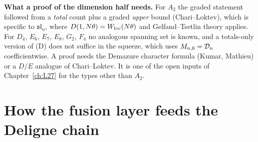 \begin{warning}
\textbf{What a proof of the dimension half needs.} For $A_2$ the graded statement followed from a \emph{total} count plus a graded
\emph{upper} bound (Chari--Loktev), which is specific to $\mathfrak{sl}_n$, where $D(1,N\theta)=W_{\mathrm{loc}}(N\theta)$ and
Gelfand--Tsetlin theory applies. For $D_4$, $E_6$, $E_7$, $E_8$, $G_2$, $F_4$ no analogous spanning set is known, and a totals-only
version of (D) does not suffice in the squeeze, which uses $M_{n,0}=\mathcal D_n$ coefficientwise. A proof needs the Demazure character
formula (Kumar, Mathieu) or a $D/E$ analogue of Chari--Loktev. It is one of the open inputs of Chapter~\ref{ch:L27} for the types other than $A_2$.
\end{warning}

\section{How the fusion layer feeds the Deligne chain}\label{l26:sec:feed}

